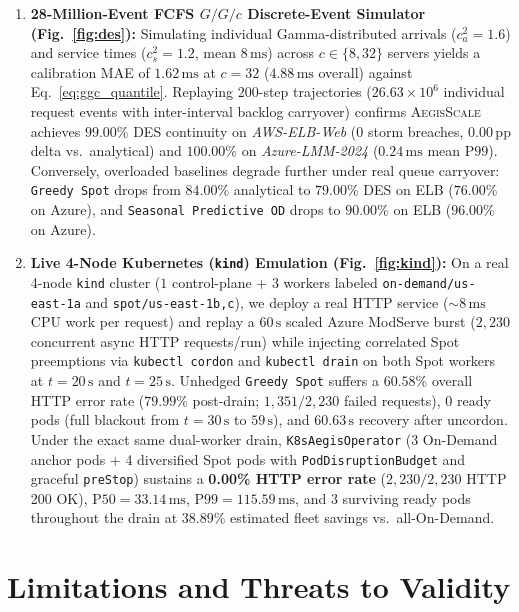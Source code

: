 \documentclass[journal]{IEEEtran}
\begin{document}
\begin{enumerate}
    \item \textbf{28-Million-Event FCFS $G/G/c$ Discrete-Event Simulator (Fig.~\ref{fig:des}):} Simulating individual Gamma-distributed arrivals ($c_a^2=1.6$) and service times ($c_s^2=1.2$, mean $8\,\mathrm{ms}$) across $c \in \{8, 32\}$ servers yields a calibration MAE of $1.62\,\mathrm{ms}$ at $c=32$ ($4.88\,\mathrm{ms}$ overall) against Eq.~\eqref{eq:ggc_quantile}. Replaying $200$-step trajectories ($26.63 \times 10^6$ individual request events with inter-interval backlog carryover) confirms \textsc{AegisScale} achieves $99.00\%$ DES continuity on \emph{AWS-ELB-Web} ($0$ storm breaches, $0.00\,\text{pp}$ delta vs.\ analytical) and $100.00\%$ on \emph{Azure-LMM-2024} ($0.24\,\mathrm{ms}$ mean $\mathrm{P99}$). Conversely, overloaded baselines degrade further under real queue carryover: \texttt{Greedy Spot} drops from $84.00\%$ analytical to $79.00\%$ DES on ELB ($76.00\%$ on Azure), and \texttt{Seasonal Predictive OD} drops to $90.00\%$ on ELB ($96.00\%$ on Azure).
    \item \textbf{Live 4-Node Kubernetes (\texttt{kind}) Emulation (Fig.~\ref{fig:kind}):} On a real 4-node \texttt{kind} cluster ($1$ control-plane + $3$ workers labeled \texttt{on-demand/us-east-1a} and \texttt{spot/us-east-1b,c}), we deploy a real HTTP service ($\sim 8\,\mathrm{ms}$ CPU work per request) and replay a $60\,\mathrm{s}$ scaled Azure ModServe burst ($2,230$ concurrent async HTTP requests/run) while injecting correlated Spot preemptions via \texttt{kubectl cordon} and \texttt{kubectl drain} on both Spot workers at $t=20\,\mathrm{s}$ and $t=25\,\mathrm{s}$. Unhedged \texttt{Greedy Spot} suffers a $60.58\%$ overall HTTP error rate ($79.99\%$ post-drain; $1,351/2,230$ failed requests), $0$ ready pods (full blackout from $t=30\,\mathrm{s}$ to $59\,\mathrm{s}$), and $60.63\,\mathrm{s}$ recovery after uncordon. Under the exact same dual-worker drain, \texttt{K8sAegisOperator} (3 On-Demand anchor pods + 4 diversified Spot pods with \texttt{PodDisruptionBudget} and graceful \texttt{preStop}) sustains a \textbf{0.00\% HTTP error rate} ($2,230/2,230$ HTTP 200 OK), $\mathrm{P50} = 33.14\,\mathrm{ms}$, $\mathrm{P99} = 115.59\,\mathrm{ms}$, and $3$ surviving ready pods throughout the drain at $38.89\%$ estimated fleet savings vs.\ all-On-Demand.
\end{enumerate}

\section{Limitations and Threats to Validity}
\end{document}

